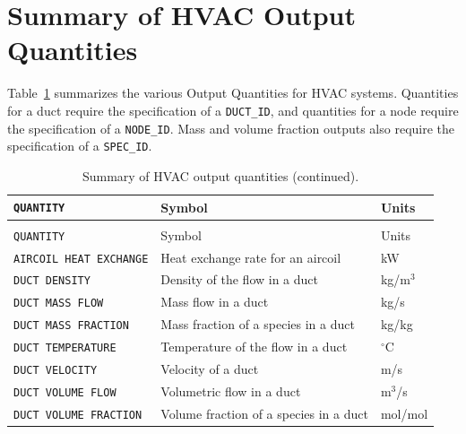 \documentclass[11pt]{book}
\newcommand{\ct}{\tt\small}
\begin{document}
\clearpage
\section{Summary of HVAC Output Quantities}
\label{info:hvacoutputquantities}

Table~\ref{tab:hvacoutput} summarizes the various Output Quantities for HVAC systems.  Quantities for a duct require the specification
of a {\ct DUCT\_ID}, and quantities for a node require the specification of a {\ct NODE\_ID}.  Mass and volume fraction outputs also require the specification of a {\ct SPEC\_ID}.

\setlength\LTleft{0pt}
\setlength\LTright{0pt}
\begin{longtable}{|l|l|l|@{\extracolsep{\fill}}}
\caption[Output quantities.]{Summary of HVAC output quantities.}
\label{tab:hvacoutput} \\
\hline
{\ct QUANTITY}                                  & Symbol                                    & Units           \\
\hline \hline
\endfirsthead
\caption[]{Summary of HVAC output quantities (continued).} \\
\hline
{\ct QUANTITY}                                  & Symbol                                    & Units           \\
\hline \hline
\endhead
{\ct AIRCOIL HEAT EXCHANGE}                     & Heat exchange rate for an aircoil         &  kW                   \\ \hline
{\ct DUCT DENSITY}                              & Density of the flow in a duct             &  kg/m$^3$             \\ \hline
{\ct DUCT MASS FLOW}                            & Mass flow in a duct                       &  kg/s                 \\ \hline
{\ct DUCT MASS FRACTION}                        & Mass fraction of a species in a duct      &  kg/kg                \\ \hline
{\ct DUCT TEMPERATURE}                          & Temperature of the flow in a duct         & $^\circ$C             \\ \hline
{\ct DUCT VELOCITY}                             & Velocity of a duct                        &  m/s                  \\ \hline
{\ct DUCT VOLUME FLOW}                          & Volumetric flow in a duct                 &  m$^3$/s              \\ \hline
{\ct DUCT VOLUME FRACTION}                      & Volume fraction of a species in a duct    &  mol/mol              \\ \hline

\end{longtable}
\end{document}

